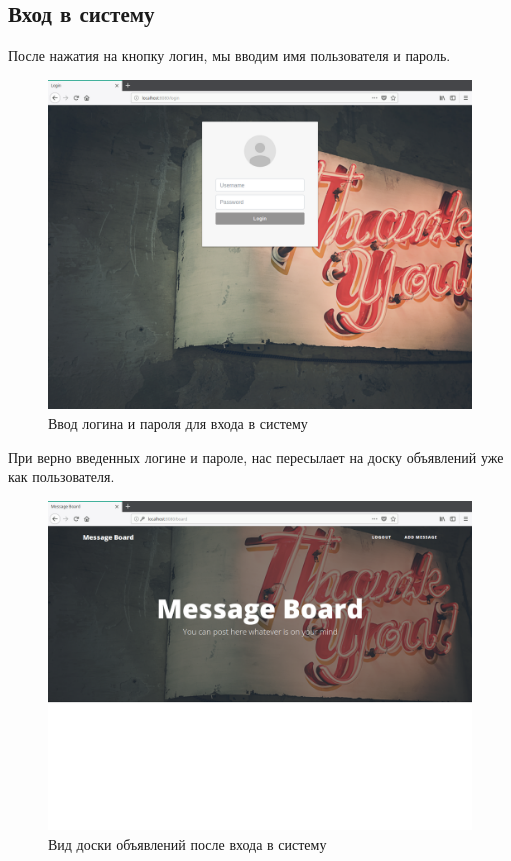 \documentclass{article}
\begin{document}
    \subsection{Вход в систему}
    После нажатия на кнопку логин, мы вводим имя пользователя и пароль.
    \begin{figure}[H]
        \begin{flushleft}
            \centerline{\includegraphics[scale=0.3]{login.png}}
            \caption{Ввод логина и пароля для входа в систему}
        \end{flushleft}
    \end{figure}
    При верно введенных логине и пароле, нас пересылает на доску объявлений уже как пользователя.
    \begin{figure}[H]
        \begin{flushleft}
            \centerline{\includegraphics[scale=0.3]{afterlogin.png}}
            \caption{Вид доски объявлений после входа в систему}
        \end{flushleft}
    \end{figure}
   \pagebreak
\end{document}
